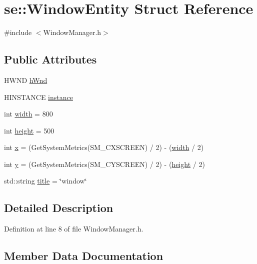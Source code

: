 \hypertarget{structse_1_1_window_entity}{}\section{se\+:\+:Window\+Entity Struct Reference}
\label{structse_1_1_window_entity}


{\ttfamily \#include $<$Window\+Manager.\+h$>$}

\subsection*{Public Attributes}
\begin{DoxyCompactItemize}
\item 
H\+W\+ND \mbox{\hyperlink{structse_1_1_window_entity_a34a4050a736c9e02867d8b198b0e3baa}{h\+Wnd}}
\item 
H\+I\+N\+S\+T\+A\+N\+CE \mbox{\hyperlink{structse_1_1_window_entity_ac3773d8ea88f418ebb9066c37856934b}{instance}}
\item 
int \mbox{\hyperlink{structse_1_1_window_entity_a131c1b7f2879d858fe72a7acf585acfe}{width}} = 800
\item 
int \mbox{\hyperlink{structse_1_1_window_entity_a03572351838f99dd81079c4808b127d7}{height}} = 500
\item 
int \mbox{\hyperlink{structse_1_1_window_entity_a44c91bca2e793ea0d8f98fbf3d97bad5}{x}} = (Get\+System\+Metrics(S\+M\+\_\+\+C\+X\+S\+C\+R\+E\+EN) / 2) -\/ (\mbox{\hyperlink{structse_1_1_window_entity_a131c1b7f2879d858fe72a7acf585acfe}{width}} / 2)
\item 
int \mbox{\hyperlink{structse_1_1_window_entity_aaf1f57802ee6ca59e01e8a2dc2245632}{y}} = (Get\+System\+Metrics(S\+M\+\_\+\+C\+Y\+S\+C\+R\+E\+EN) / 2) -\/ (\mbox{\hyperlink{structse_1_1_window_entity_a03572351838f99dd81079c4808b127d7}{height}} / 2)
\item 
std\+::string \mbox{\hyperlink{structse_1_1_window_entity_aa809ff17e21b75a1f680b004c83fc80a}{title}} = \char`\"{}window\char`\"{}
\end{DoxyCompactItemize}


\subsection{Detailed Description}


Definition at line 8 of file Window\+Manager.\+h.



\subsection{Member Data Documentation}
\mbox{\label{structse_1_1_window_entity_a03572351838f99dd81079c4808b127d7}} 

